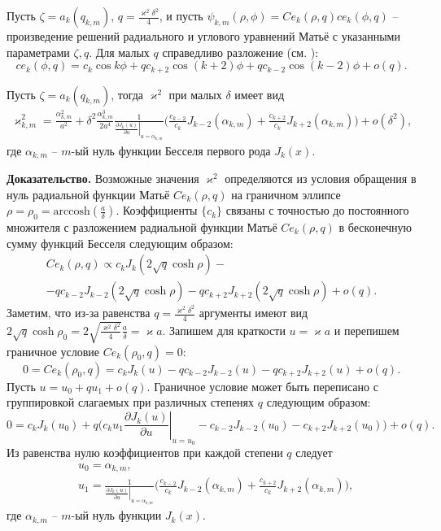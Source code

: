 Пусть $\zeta = a_k(q_{k, m})$, $q=\frac{\varkappa^2 \delta^2}{4}$, и пусть $\psi_{k,m}(\rho, \phi) = Ce_k(\rho, q)ce_k(\phi, q)$ -- произведение решений радиального и углового уравнений Матьё с указанными параметрами $\zeta, q$. Для малых $q$ справедливо разложение (см. \cite[\S~2.2, с.~122---124]{wref12}):
$$ce_k(\phi, q) = c_k \cos{k \phi} + q c_{k+2} \cos{(k+2) \phi} +q c_{k-2} \cos{(k-2) \phi} + o(q).$$ 
\begin{lemma}
Пусть $\zeta = a_k(q_{k, m})$, тогда $\varkappa^2$ при малых $\delta$ имеет вид
\begin{multline*}
\varkappa_{k, m}^2 = 
\frac{\alpha_{k, m}^2}{a^2} +  \delta^2 \frac{\alpha_{k, m}^3}{2 a^4}\frac{1}{\left.\frac{\partial J_{k} (u)}{\partial u}\right|_{u=\alpha_{k, m}}} 
\biggl(
\frac{c_{k-2}}{c_k} J_{k-2}(\alpha_{k, m}) + \frac{c_{k+2} }{c_k} J_{k+2}(\alpha_{k, m})
\biggr) + o(\delta^2),
\end{multline*}
где $\alpha_{k, m}$ -- $m$-ый нуль функции Бесселя первого рода $J_{k}(x)$.
\label{th:lemEllipse1}
\end{lemma}
\textbf{Доказательство.}
Возможные значения $\varkappa^2$ определяются из условия обращения в нуль радиальной функции Матьё $Ce_k(\rho, q)$ на граничном эллипсе $\rho = \rho_0 = \text{arccosh} (\frac{a}{\delta})$.
Коэффициенты $\{c_k\}$ связаны \cite{wref2} с точностью до постоянного множителя с разложением радиальной функции Матьё $Ce_k(\rho, q)$ в бесконечную сумму функций Бесселя следующим образом:
\begin{multline*}
Ce_k(\rho, q) \propto 
	c_k J_k(2\sqrt{q}\cosh{\rho}) - \\
	- q c_{k-2} J_{k-2}(2\sqrt{q}\cosh{\rho}) -
	q c_{k+2} J_{k+2}(2\sqrt{q}\cosh{\rho}) + o(q).
\end{multline*}
Заметим, что из-за равенства $q = \frac{\varkappa^2\delta^2}{4}$ аргументы имеют вид $2 \sqrt{q} \cosh{\rho_0} = 2 \sqrt{\frac{\varkappa^2 \delta^2}{4}} \frac{a}{\delta} = \varkappa a$. 
Запишем для краткости $u = \varkappa a$ и перепишем граничное условие $Ce_k(\rho_0, q) = 0$:
$$0 = Ce_k(\rho_0, q) =
	c_k J_k(u) 
	- q c_{k-2} J_{k-2}(u) -
	q c_{k+2} J_{k+2}(u) + o(q).$$
Пусть $u = u_0 + q u_1 + o(q)$. Граничное условие может быть переписано с группировкой слагаемых при различных степенях $q$ следующим образом:
$$0 =
	c_k J_k(u_0) + q \biggl(
	c_k u_1 \left.\frac{\partial  J_k(u)}{\partial u}\right|_{u=u_0}
	-  c_{k-2} J_{k-2}(u_0) - c_{k+2} J_{k+2}(u_0) 
	\biggr)+ o(q).$$
Из равенства нулю коэффициентов при каждой степени $q$ следует
\begin{align*}
&u_0 = \alpha_{k, m}, \\
&u_1 = \frac{1}{\left.\frac{\partial J_{k} (u)}{\partial u}\right|_{u=\alpha_{k, m}}} 
\biggl(
\frac{c_{k-2}}{c_k} J_{k-2}(\alpha_{k, m}) + \frac{c_{k+2} }{c_k} J_{k+2}(\alpha_{k, m})
\biggr),
\end{align*}
где $\alpha_{k, m}$ -- $m$-ый нуль функции $J_k(x)$.  

